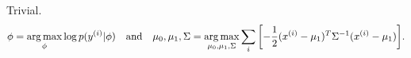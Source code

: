 \begin{answer}
	Trivial.
	\[
		\phi=\argmax_{\phi}\log p(y^{(i)}|\phi)
		\qand
		\mu_0,\mu_1,\Sigma
		=
		\argmax_{\mu_0,\mu_1,\Sigma}\sum_i\qty[-\frac{1}{2}(x^{(i)}-\mu_1)^T\Sigma^{-1}(x^{(i)}-\mu_1)]
	.\] 
\end{answer}

